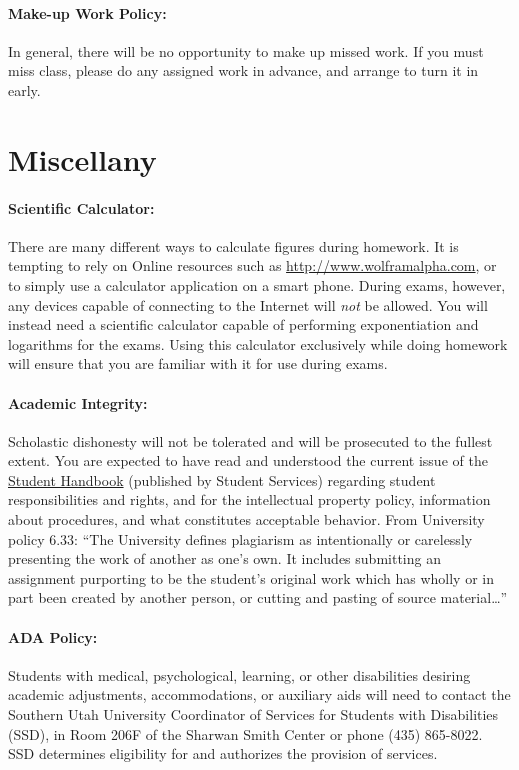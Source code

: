 \documentclass[12pt, letterpaper]{article}
\begin{document}
\paragraph{Make-up Work Policy:}
In general, there will be no opportunity to make up missed work. If you must miss class, please do any assigned work in advance, and arrange to turn it in early.

\section*{Miscellany}
\paragraph{Scientific Calculator:}
There are many different ways to calculate figures during homework. It is tempting to rely on Online resources such as \href{http://www.wolframalpha.com}{http://www.wolframalpha.com}, or to simply use a calculator application on a smart phone. During exams, however, any devices capable of connecting to the Internet will \emph{not} be allowed. You will instead need a scientific calculator capable of performing exponentiation and logarithms for the exams. Using this calculator exclusively while doing homework will ensure that you are familiar with it for use during exams.

\paragraph{Academic Integrity:}
Scholastic dishonesty will not be tolerated and will be prosecuted to the fullest extent. You are expected to have read and understood the current issue of the \href{https://help.suu.edu/handbook}{Student Handbook} (published by Student Services) regarding student responsibilities and rights, and for the intellectual property policy, information about procedures, and what constitutes acceptable behavior. From University policy 6.33: ``The University defines plagiarism as intentionally or carelessly presenting the work of another as one’s own. It includes submitting an assignment purporting to be the student’s original work which has wholly or in part been created by another person, or cutting and pasting of source material\ldots''

\paragraph{ADA Policy:}
Students with medical, psychological, learning, or other disabilities desiring academic adjustments, accommodations, or auxiliary aids will need to contact the Southern Utah University Coordinator of Services for Students with Disabilities (SSD), in Room 206F of the Sharwan Smith Center or phone (435) 865-8022. SSD determines eligibility for and authorizes the provision of services.
\end{document}
